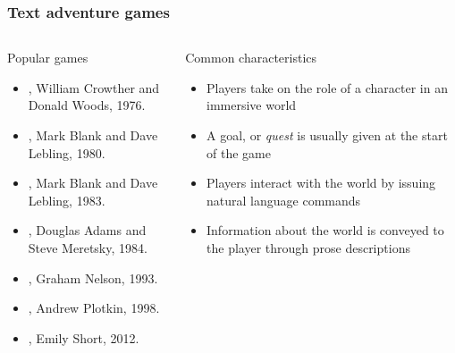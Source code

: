 \begin{frame}

    \frametitle{Text adventure games}
    \begin{columns}
        \begin{block}{Popular games}
            {\footnotesize
            \begin{itemize}
                \item {}, William Crowther and Donald
                    Woods, 1976.
                \item {}, Mark Blank and Dave Lebling, 1980.
                \item {}, Mark Blank and Dave Lebling,
                    1983.
                \item {},
                    Douglas Adams and Steve Meretsky, 1984.
                \item {}, Graham Nelson, 1993.
                \item {}, Andrew Plotkin, 1998.
                \item {}, Emily Short, 2012.
            \end{itemize}
            \parencite{interactive_fiction_technology_foundation_interactive_nodate}
        }
        \end{block}

        \begin{block}{Common characteristics}
            \begin{itemize}
                \item Players take on the role of a character in an
                    immersive world
                \item A goal, or \emph{quest} is usually given at the
                    start of the game
                \item Players interact with the world by issuing natural
                    language commands
                \item Information about the world is conveyed to the
                    player through prose descriptions
            \end{itemize}
        \end{block}
    \end{columns}

\end{frame}

